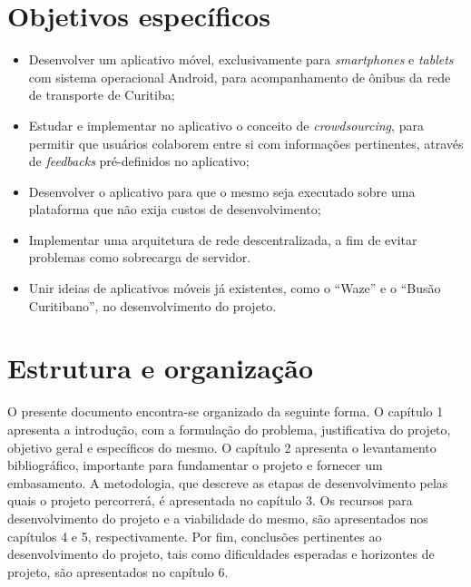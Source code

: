 \section{Objetivos específicos}

\begin{itemize}
\item Desenvolver um aplicativo móvel, exclusivamente para \textit{smartphones} e \textit{tablets} com sistema operacional Android, para acompanhamento de ônibus da rede de transporte de Curitiba;
\item Estudar e implementar no aplicativo o conceito de \textit{crowdsourcing}, para permitir que usuários colaborem entre si com informações pertinentes, através de \textit{feedbacks} pré-definidos no aplicativo;
\item Desenvolver o aplicativo para que o mesmo seja executado sobre uma plataforma que não exija custos de desenvolvimento;
\item Implementar uma arquitetura de rede descentralizada, a fim de evitar problemas como sobrecarga de servidor.
\item Unir ideias de aplicativos móveis já existentes, como o ``Waze'' e o ``Busão Curitibano'', no desenvolvimento do projeto.
\end{itemize}

\section{Estrutura e organização}

O presente documento encontra-se organizado da seguinte forma. O capítulo 1 apresenta a introdução, com a formulação do problema, justificativa do projeto, objetivo geral e específicos do mesmo. O capítulo 2 apresenta o levantamento bibliográfico, importante para fundamentar o projeto e fornecer um embasamento. A metodologia, que descreve as etapas de desenvolvimento pelas quais o projeto percorrerá, é apresentada no capítulo 3. Os recursos para desenvolvimento do projeto e a viabilidade do mesmo, são apresentados nos capítulos 4 e 5, respectivamente. Por fim, conclusões pertinentes ao desenvolvimento do projeto, tais como dificuldades esperadas e horizontes de projeto, são apresentados no capítulo 6.
